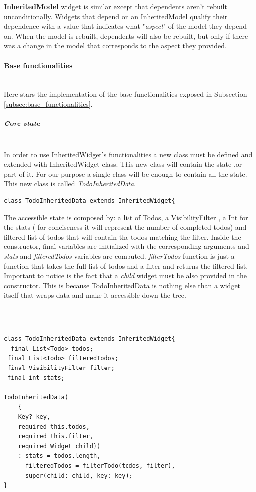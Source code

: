 \textbf{InheritedModel} widget is similar except that dependents aren't rebuilt unconditionally.
Widgets that depend on an InheritedModel qualify their dependence with a value that indicates what "\textit{aspect}" of the model they depend on. When the model is rebuilt, dependents will also be rebuilt, but only if there was a change in the model that corresponds to the aspect they provided.
\paragraph{Base functionalities} \mbox{} \\
\label{par:todo_app_inherited_widget_base_app}
Here stars the implementation of the base functionalities exposed in Subsection \ref{subsec:base_functionalities}.
\subparagraph{Core state}\mbox{}\\
\label{subpar:todo_app_inherited_widget_core_state}
In order to use InheritedWidget's functionalities a new class must be defined and extended with InheritedWidget class. This new class will contain the state ,or part of it. For our purpose a single class will be enough to contain all the state. This new class is called \textit{TodoInheritedData}.

 \mbox{}

\begin{verbatim}
class TodoInheritedData extends InheritedWidget{
\end{verbatim}
\mbox{}

The accessible state is composed by: a list of Todos, a VisibilityFilter , a Int for the stats ( for conciseness it will represent the number of completed todos) and filtered list of todos that will contain the todos matching the filter. Inside the constructor, final variables are initialized with the corresponding arguments and \textit{stats} and \textit{filteredTodos} variables are computed. \textit{filterTodos} function is just a function that takes the full list of todos and a filter and returns the filtered list. Important to notice is the fact that a \textit{child} widget must be also provided in the constructor. This is because TodoInheritedData is nothing else than a widget itself that wraps data and make it accessible down the tree.

\mbox{}\\
 \mbox{}

\begin{verbatim}

class TodoInheritedData extends InheritedWidget{
  final List<Todo> todos;
 final List<Todo> filteredTodos;
 final VisibilityFilter filter;
 final int stats;
 
TodoInheritedData(
    { 
    Key? key,
    required this.todos,
    required this.filter,
    required Widget child})
    : stats = todos.length,
      filteredTodos = filterTodo(todos, filter),
      super(child: child, key: key);
}
\end{verbatim}


